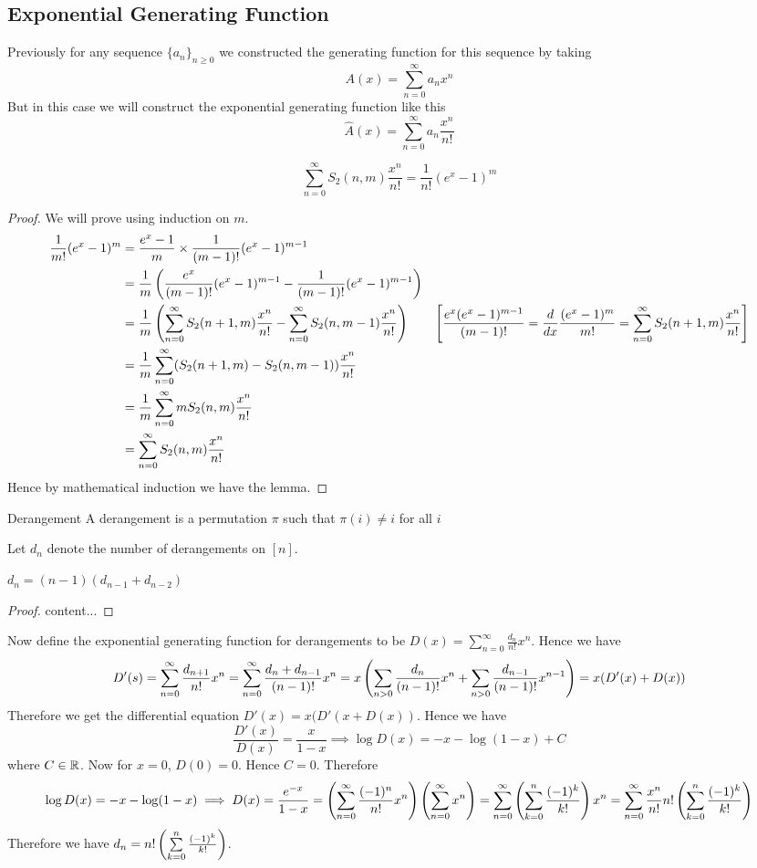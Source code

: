 \subsection{Exponential Generating Function}
Previously for any sequence $\{a_n\}_{n\geq 0}$ we constructed the generating function for this sequence by taking $$A(x)=\sum_{n=0}^{\infty}a_nx^n$$But in this case we will construct the exponential generating function like this $$\hat{A}(x)=\sum_{n=0}^{\infty}a_n\frac{x^n}{n!}$$
\begin{lemma}{}{}
	$$\sum_{n=0}^{\infty}S_2(n,m)\frac{x^n}{n!}=\frac{1}{n!}(e^x-1)^m$$
\end{lemma}
\begin{proof}We will prove using induction on $m$.
	\begin{align*}
		\frac{1}{m!}(e^x-1)^m & = \frac{e^x-1}{m}\times \frac1{(m-1)!}(e^x-1)^{m-1}\\
	& = \frac1m\left(  \frac{e^x}{(m-1)!}(e^x-1)^{m-1}-\frac1{(m-1)!}(e^x-1)^{m-1}  \right)\\
	& = \frac1m\left( \sum_{n=0}^{\infty}S_2(n+1,m)\frac{x^n}{n!}-\sum_{n=0}^{\infty}S_2(n,m-1)\frac{x^n}{n!} \right)&\left[\frac{e^x(e^x-1)^{m-1}}{(m-1)!}=\frac{d}{dx}\frac{(e^x-1)^{m}}{m!}=\sum_{n=0}^{\infty} S_2(n+1,m)\frac{x^n}{n!} \right]\\
	& = \frac1m\sum_{n=0}^{\infty}(S_2(n+1,m)-S_2(n,m-1))\frac{x^n}{n!}\\
	&= \frac1m\sum_{n=0}^{\infty}mS_2(n,m)\frac{x^n}{n!}\\
	&= \sum_{n=0}^{\infty}S_2(n,m)\frac{x^n}{n!}
	\end{align*}Hence by mathematical induction we have the lemma.
\end{proof}
\begin{Definition}{Derangement}{}
	A derangement is a permutation $\pi$ such that $\pi(i)\neq i$ for all $i$
\end{Definition}
Let $d_n$ denote the number of derangements on $[n]$. 
\begin{lemma}{}{}
	$d_n=(n-1)(d_{n-1}+d_{n-2})$
\end{lemma}
\begin{proof}
	content...
\end{proof}

Now define the exponential generating function for derangements to be $D(x)=\sum\limits_{n=0}^{\infty}\frac{d_n}{n!}x^n$. Hence we have $$D'(s)=\sum_{n=0}^{\infty}\frac{d_{n+1}}{n!}x^n=\sum_{n=0}^{\infty}\frac{d_n+d_{n-1}}{(n-1)!}x^n=x\left(\sum_{n>0}\frac{d_n}{(n-1)!}x^n+\sum_{n>0}\frac{d_{n-1}}{(n-1)!}x^{n-1}    \right)=x(D'(x)+D(x))$$Therefore we get the differential equation  $D'(x)=x(D'(x+D(x))$. Hence we have $$\frac{D'(x)}{D(x)}=\frac{x}{1-x}\implies \log D(x)=-x-\log (1-x)+C$$where $C\in\mathbb{R}$. Now for $x=0$, $D(0)=0$. Hence $C=0$. Therefore $$\log D(x)=-x-\log(1-x)\implies D(x)=\frac{e^{-x}}{1-x}=\left(\sum_{n=0}^{\infty}\frac{(-1)^n}{n!}x^n\right)\left(\sum_{n=0}^{\infty}x^n\right)=\sum_{n=0}^{\infty}\left( \sum_{k=0}^n\frac{(-1)^k}{k!} \right)x^n=\sum_{n=0}^{\infty}\frac{x^n}{n!}n!\left( \sum_{k=0}^n\frac{(-1)^k}{k!} \right)$$Therefore we have $ d_n=n!\left( \sum\limits_{k=0}^n\frac{(-1)^k}{k!} \right)$.



